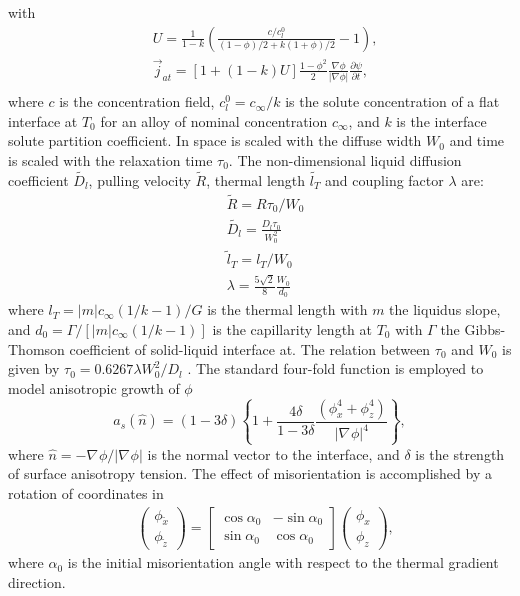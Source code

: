 \documentclass[final,times]{elsarticle}
\numberwithin{equation}{section}
\newcommand{\T}[1]{\tilde{#1}}
\newcommand{\grad}[1]{\nabla_{#1}}
\begin{document}
with
\begin{align}
& U = \frac{1}{1-k} \left( \frac{ c/c_l^0}{(1-\phi)/2 + k(1+\phi)/2} -1\right), \\
& \vec{j}_{at} =  [1+(1-k)U]\frac{1-\phi^{2}}{{2}}  \frac{\nabla \phi}{|\nabla \phi|} \frac{\partial \psi}{\partial t}, \\
\end{align}
where $c$ is the concentration field, $c_l^0 = c_{\infty}/k$ is the solute concentration of a flat interface at $T_0$ for an alloy of nominal concentration $c_{\infty}$, and $k$ is the interface solute partition coefficient. In  space is scaled with the diffuse width $W_0$ and time is scaled with the relaxation time $\tau_0$. The non-dimensional liquid diffusion coefficient $\tilde{D_l}$, pulling velocity $\tilde{R}$, thermal length $\tilde{l_T}$ and coupling factor $\lambda$ are:
\begin{align}
    & \tilde{R} = R\tau_0 / W_0 \\
    & \tilde{D_l} = \frac{ D_l \tau_0 } { W_0^2 }  \\
    & \tilde{l}_T = l_T / W_0 \\
    & \lambda =  \frac{5\sqrt{2}}{8}  \frac{W_0}{d_0} 
\end{align}
 where $ l_T = {|m|c_{\infty}(1/k-1)}/{G}$ is the thermal length with $m$ the liquidus slope, and $d_0 = {\Gamma}/{  [ |m|c_{\infty}(1/k-1)] }$  is the capillarity length at $T_0$ with $\Gamma$ the Gibbs-Thomson coefficient of solid-liquid interface at. The relation between $\tau_0$ and $W_0$ is given by $\tau_0 =  {0.6267\lambda W_0^2}/{D_l} $ \cite{Echebarria2004}.  The standard four-fold function is employed to model anisotropic growth of $\phi$
\begin{equation}
a_{s}(\hat{n}) = (1-3\delta)\left\{1+\frac{4 \delta}{1-3\delta}  \frac{(\phi_{{x}}^4 +\phi_{{z}}^4 )}{| {\grad{}} \phi|^4}  \right\}, \label{eq:anisotropy}
\end{equation}
where $\hat{n} = - \grad{} \phi / | \grad{} \phi|$ is the normal vector to the interface, and $\delta$ is the strength of surface anisotropy tension. The effect of misorientation  is accomplished by a rotation of coordinates in 
\begin{align}
& \left( 
\begin{array}{c}
\phi_{\T{x}} \\ 
\phi_{\T{z}}
\end{array}
\right)
=
\left[
\begin{array}{cc}
\cos \alpha_{0} & -\sin \alpha_{0} \\
\sin \alpha_{0} & \cos \alpha_{0}
\end{array}
\right]
\left( 
\begin{array}{c}
\phi_{x} \\ 
\phi_{z}
\end{array}
\right),
\end{align}
where $\alpha_0$ is the initial misorientation angle with respect to the thermal gradient direction.
\end{document}
